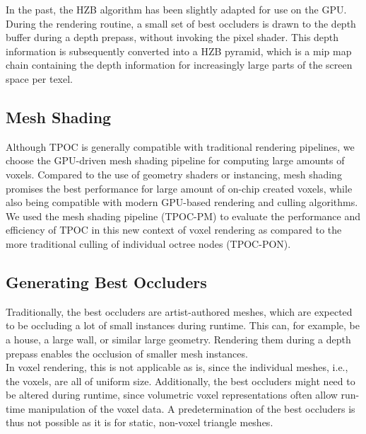 \documentclass[conference]{IEEEtran}
\begin{document}
\noindent
In the past, the \ac{HZB} algorithm has been slightly adapted for use on the \ac{GPU}. During the rendering 
routine, a small set of best occluders is drawn to the depth buffer during a depth prepass, without invoking 
the pixel shader. This depth information is subsequently converted into a \ac{HZB} pyramid, which is a mip 
map chain containing the depth information for increasingly large parts of the screen space per texel. \\


\subsection{Mesh Shading}

\noindent
Although \ac{TPOC} is generally compatible with traditional rendering pipelines, we choose the 
\ac{GPU}-driven mesh shading pipeline for computing large amounts of voxels. Compared to the use 
of geometry shaders or instancing, mesh shading promises the best performance for large amount 
of on-chip created voxels, while also being compatible with modern \ac{GPU}-based rendering and 
culling algorithms. \\

\noindent
We used the mesh shading pipeline (\ac{TPOC-PM}) to evaluate the performance and efficiency of 
\ac{TPOC} in this new context of voxel rendering as compared to the more traditional culling of 
individual octree nodes (\ac{TPOC-PON}). 

\subsection{Generating Best Occluders} \label{sec-gen-best-occluders}

\noindent
Traditionally, the best occluders are artist-authored meshes, which are expected to be occluding a lot 
of small instances during runtime. This can, for example, be a house, a large wall, or similar large 
geometry. Rendering them during a depth prepass enables the occlusion of smaller mesh instances. \\

\noindent
In voxel rendering, this is not applicable as is, since the individual meshes, i.e., the voxels, are all 
of uniform size. Additionally, the best occluders might need to be altered during runtime, since 
volumetric voxel representations often allow run-time manipulation of the voxel data. A predetermination 
of the best occluders is thus not possible as it is for static, non-voxel triangle meshes. \\
\end{document}
